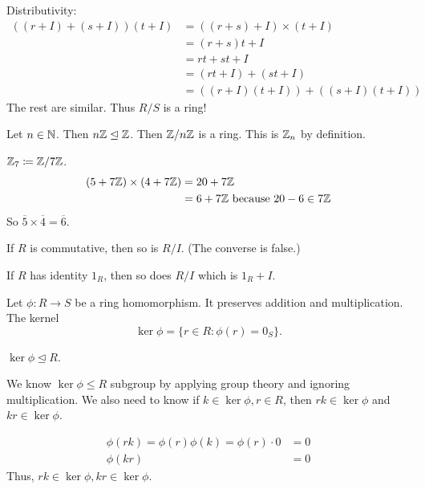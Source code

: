 \documentclass[class=article,crop=false]{standalone}
\begin{document}
Distributivity:
\begin{align*}
	((r+I) + (s+I))(t+I) &= ((r+s)+I) \times (t+I) \\
			     &= (r+s) t + I \\
			     &= rt + st + I \\
			     &= (rt + I) +(st + I) \\
			     &= ((r+I)(t+I)) + ((s+I)(t+I))
\end{align*}
The rest are similar. Thus $ R /S$ is a ring!

\begin{eg}[]
Let $ n \in \mathbb{N}$. Then $ n \mathbb{Z} \trianglelefteq \mathbb{Z}$. Then $ \mathbb{Z} /n\mathbb{Z}$ is a ring. This is $ \mathbb{Z}_n$ by definition.
\end{eg}
\begin{eg}[]
$ \mathbb{Z}_7 \coloneqq \mathbb{Z} / 7\mathbb{Z}$.
\begin{align*}
	(5+7 \mathbb{Z})\times (4+7\mathbb{Z}) &= 20 + 7\mathbb{Z} \\
	&= 6+ 7\mathbb{Z} \text{ because } 20-6 \in 7\mathbb{Z}  
\end{align*}
So $ \overline{5} \times \overline{4} = \overline{6}$. 
\end{eg}

\begin{thm}[]
	If $ R$ is commutative, then  so is  $ R /I$.  (The converse is false.)

	If $ R$ has identity $ 1_R$, then so does  $ R /I$ which is  $ 1_R + I$.
\end{thm}

Let $ \phi: R \to S$ be a ring homomorphism. It preserves addition and multiplication. The kernel
\[
	\ker \phi = \{r \in R: \phi(r) = 0_S\} 
.\] 
\begin{thm}[]
$ \ker \phi \trianglelefteq R$.
\end{thm}

\begin{prf}
We know $ \ker \phi \leq R$ subgroup by applying group theory and ignoring multiplication. We also need to know if $ k \in \ker \phi, r \in R$, then $ rk \in \ker \phi$ and $ kr \in \ker \phi$.

\begin{align*}
	\phi(rk) = \phi(r) \phi(k) = \phi(r) \cdot  0 &= 0\\
	\phi(kr) &=0 
\end{align*}
Thus, $ rk \in \ker \phi, kr \in \ker \phi$.
\end{prf}
\end{document}
